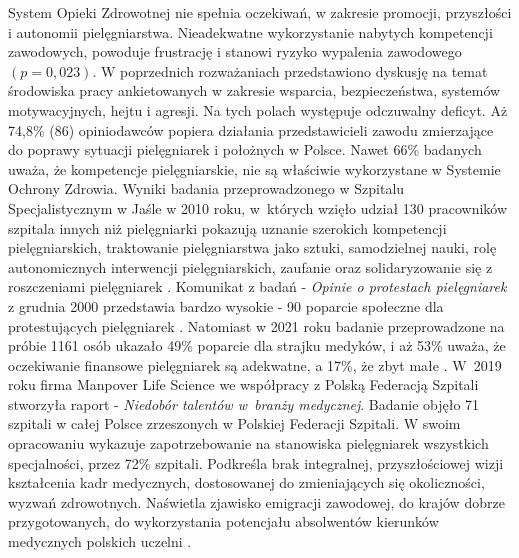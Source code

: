 \documentclass[a4paper,12pt,twoside,openright]{mwrep}
\begin{document}
System Opieki Zdrowotnej nie spełnia oczekiwań, w zakresie promocji, przyszłości i autonomii pielęgniarstwa. Nieadekwatne  wykorzystanie nabytych kompetencji zawodowych, powoduje frustrację i stanowi ryzyko wypalenia zawodowego $(p=0,023)$. W poprzednich rozważaniach przedstawiono dyskusję  na temat środowiska pracy ankietowanych w zakresie wsparcia, bezpieczeństwa, systemów motywacyjnych, hejtu  i agresji. Na tych polach występuje odczuwalny deficyt. Aż 74,8\%  (86) opiniodawców  popiera działania przedstawicieli zawodu zmierzające do poprawy sytuacji pielęgniarek i położnych w Polsce. Nawet  66\%  badanych uważa, że kompetencje pielęgniarskie, nie są właściwie wykorzystane w Systemie Ochrony Zdrowia. Wyniki badania przeprowadzonego w Szpitalu Specjalistycznym w Jaśle w 2010 roku, w~których wzięło udział 130 pracowników szpitala innych niż pielęgniarki pokazują uznanie szerokich kompetencji pielęgniarskich, traktowanie pielęgniarstwa jako sztuki, samodzielnej nauki, rolę autonomicznych interwencji pielęgniarskich, zaufanie oraz solidaryzowanie się z roszczeniami pielęgniarek \cite{skorupska}. Komunikat z badań -  \textit{Opinie o protestach pielęgniarek} z grudnia 2000 przedstawia bardzo wysokie - 90  poparcie  społeczne dla protestujących pielęgniarek \cite{cebos}. Natomiast w 2021 roku badanie przeprowadzone na próbie 1161 osób ukazało 49\% poparcie dla strajku medyków, i aż 53\% uważa, że oczekiwanie finansowe pielęgniarek są adekwatne, a 17\%, że zbyt małe \cite{cebos2}. W~2019 roku firma Manpover Life Science we współpracy z Polską Federacją Szpitali stworzyła raport - \textit{Niedobór talentów w~branży medycznej}. Badanie objęło 71 szpitali w całej Polsce zrzeszonych w Polskiej Federacji Szpitali. W swoim opracowaniu wykazuje zapotrzebowanie na stanowiska pielęgniarek wszystkich specjalności, przez 72\% szpitali. Podkreśla brak integralnej, przyszłościowej wizji kształcenia kadr medycznych, dostosowanej do zmieniających się okoliczności, wyzwań zdrowotnych. Naświetla zjawisko emigracji zawodowej,  do krajów dobrze przygotowanych, do wykorzystania potencjału absolwentów kierunków medycznych polskich uczelni \cite{federacja}.
\end{document}
